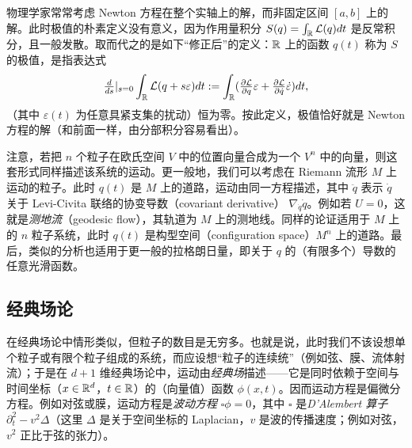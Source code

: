 
\begin{remark}
物理学家常常考虑 Newton 方程在整个实轴上的解，而非固定区间 $[a,b]$ 上的解。此时极值的朴素定义没有意义，因为作用量积分 $S(q)=\int_{\Bbb R}{\mathcal L}(q)dt$ 是反常积分，且一般发散。取而代之的是如下“修正后”的定义：$\Bbb R$ 上的函数 $q(t)$ 称为 $S$ 的极值，是指表达式
$$
\tfrac{d}{ds}|_{s=0}\int_{\Bbb R}{\mathcal L}(q+s\varepsilon)dt:=
\int_{\Bbb R}(\tfrac{\partial \mathcal L}{\partial q}\varepsilon+
\tfrac{\partial \mathcal L}{\partial \dot{q}}\dot{\varepsilon})dt,
$$
（其中 $\varepsilon(t)$ 为任意具紧支集的扰动）恒为零。按此定义，极值恰好就是 Newton 方程的解（和前面一样，由分部积分容易看出）。
\end{remark}

\begin{remark} 注意，若把 $n$ 个粒子在欧氏空间 $V$ 中的位置向量合成为一个 $V^{n}$ 中的向量，则这套形式同样描述该系统的运动。更一般地，我们可以考虑在 Riemann 流形 $M$ 上运动的粒子。此时 $q(t)$ 是 $M$ 上的道路，运动由同一方程描述，其中 $\ddot{q}$ 表示 $\dot{q}$ 关于 Levi-Civita 联络的协变导数（covariant derivative） $\nabla_{\dot q}\dot q$。例如若 $U=0$，这就是\emph{测地流}（geodesic flow），其轨道为 $M$ 上的测地线。同样的论证适用于 $M$ 上的 $n$ 粒子系统，此时 $q(t)$ 是构型空间（configuration space）$M^n$ 上的道路。最后，类似的分析也适用于更一般的拉格朗日量，即关于 $q$ 的（有限多个）导数的任意光滑函数。
\end{remark}

\subsection{经典场论}

在经典场论中情形类似，但粒子的数目是无穷多。也就是说，此时我们不该设想单个粒子或有限个粒子组成的系统，而应设想“粒子的连续统”（例如弦、膜、流体射流）；于是在 $d+1$ 维经典场论中，运动由\emph{经典场}描述——它是同时依赖于空间与时间坐标（$x\in \Bbb R^d$，$t\in \Bbb R$）的（向量值）函数 $\phi(x,t)$。因而运动方程是偏微分方程。例如对弦或膜，运动方程是\emph{波动方程} $\square \phi=0$，其中 $\square$ 是\emph{D'Alembert 算子} $\partial_t^2-v^{2}\Delta$（这里 $\Delta$ 是关于空间坐标的 Laplacian，$v$ 是波的传播速度；例如对弦，$v^2$ 正比于弦的张力）。

